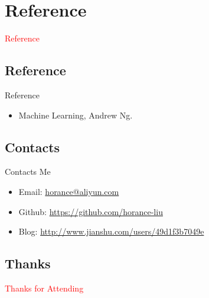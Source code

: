 \section{Reference}
\label{sec:reference}

\begin{frame}
  \begin{center}
    \Huge{\textcolor{red}{Reference}}
  \end{center}
\end{frame}

\subsection{Reference}

\begin{frame}{Reference}
  \begin{itemize}
    \item \alert{Machine Learning}, Andrew Ng.
  \end{itemize}
\end{frame}

\subsection{Contacts}

\begin{frame}{Contacts Me}
    \begin{itemize}
    \item \alert{Email}: \href{horance@aliyun.com}{horance@aliyun.com}
    \item \alert{Github}: \href{https://github.com/horance-liu}{https://github.com/horance-liu} 
    \item \alert{Blog}: \href{http://www.jianshu.com/users/49d1f3b7049e}{http://www.jianshu.com/users/49d1f3b7049e}
    \end{itemize}
\end{frame}

\subsection{Thanks}

\begin{frame}{}
  \begin{center}
    \Huge{\textcolor{red}{Thanks for Attending}}
  \end{center}
\end{frame}
